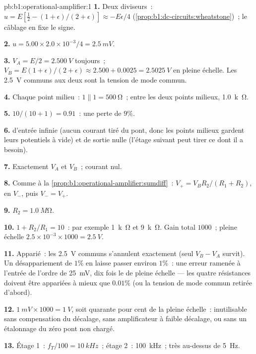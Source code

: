 \begin{solution}{pb:b1:operational-amplifier:1}
\textbf{1.} Deux diviseurs~: $u = E[\tfrac12 - (1 + \epsilon)/(2 + \epsilon)]
\approx -E\epsilon/4$ (\cref{prop:b1:dc-circuits:wheatstone})~; le
câblage en fixe le signe.

\textbf{2.} $u = 5.00 \times 2.0\times10^{-3}/4 = \qty{2.5}{mV}$.

\textbf{3.} $V_A = E/2 = \qty{2.500}{V}$ toujours~; $V_B = E(1 + \epsilon)/(2 +
\epsilon) \approx 2.500 + 0.0025 = \qty{2.5025}{V}$ en pleine échelle. Les
\qty{2.5}{V} communs aux deux sont la tension de mode commun.

\textbf{4.} Chaque point milieu~: $1 \parallel 1 = \qty{500}{\ohm}$~;
entre les deux points milieux, \qty{1.0}{k\ohm}.

\textbf{5.} $10/(10 + 1) = 0.91$~: une perte de $9\%$.

\textbf{6.}  d'entrée infinie (aucun courant tiré du pont, donc
les points milieux gardent leurs potentiels à vide) et  de
sortie nulle (l'étage suivant peut tirer ce dont il a besoin).

\textbf{7.} Exactement $V_A$ et $V_B$~; courant nul.

\textbf{8.} Comme à la \cref{prop:b1:operational-amplifier:sumdiff}~: $V_+ =
V_BR_2/(R_1 + R_2)$,  en $V_-$, puis $V_- = V_+$.

\textbf{9.} $R_2 = \qty{1.0}{M\ohm}$.

\textbf{10.} $1 + R_2/R_1 = 10$~: par exemple \qty{1}{k\ohm} et \qty{9}{k\ohm}.
Gain total $1000$~; pleine échelle $2.5 \times 10^{-3} \times 1000 = \qty{2.5}{V}$.

\textbf{11.} Apparié~: les \qty{2.5}{V} communs s'annulent exactement
(seul $V_B - V_A$ survit). Un désappariement de $1\%$ en laisse passer
environ $1\%$~: une erreur ramenée à l'entrée de l'ordre de \qty{25}{mV},
dix fois le  de pleine échelle --- les quatre résistances doivent
être appariées à mieux que $0.01\%$ (ou la tension de mode commun
retirée d'abord).

\textbf{12.} $1\ \unit{mV} \times 1000 = \qty{1}{V}$, soit quarante pour
cent de la pleine échelle~: inutilisable sans compensation du décalage,
sans amplificateur à faible décalage, ou sans un étalonnage du zéro
pont non chargé.

\textbf{13.} Étage 1~: $f_T/100 = \qty{10}{kHz}$~; étage 2~: \qty{100}{kHz}~;
très au-dessus de \qty{5}{Hz}.


\end{solution}
